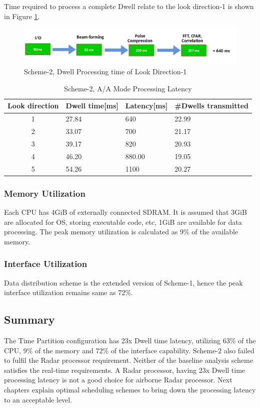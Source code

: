 Time required to process a complete Dwell relate to the look direction-1 is shown in Figure \ref{fig:mm:scheme2_latency_tot}.
\begin{figure}[h!]
	\centering
	\includegraphics[width=145mm]{figures/scheme2_latency_tot}
	\caption{Scheme-2, Dwell Processing time of Look Direction-1}
	\label{fig:mm:scheme2_latency_tot}
\end{figure}

\begin{table}[h!]
	\centering
	\begin{tabular}{|c|l|l|l|} 
	 \hline
	 \textbf{Look direction} & \textbf{Dwell time[ms]} & \textbf{Latency[ms]} & \textbf{\#Dwells transmitted} \\
	 \hline
	 1 & 27.84 & 640 & 22.99 \\ \hline
	 2 & 33.07 & 700 & 21.17 \\ \hline
	 3 & 39.17 & 820 & 20.93 \\ \hline
	 4 & 46.20 & 880.00 & 19.05 \\ \hline
	 5 & 54.26 & 1100 & 20.27 \\ \hline
	\end{tabular}
	\caption{Scheme-2, A/A Mode Processing Latency}
	\label{tbl:existing_analysis:aa_scheme2_latency}
\end{table}

\subsubsection{Memory Utilization}
\label{sss:scheme2:mem_util}
Each CPU has 4GiB of externally connected SDRAM. It is assumed that 3GiB are allocated for OS, storing executable code, etc, 1GiB are available for data processing. The peak memory utilization is calculated as 9\% of the available memory.

\subsubsection{Interface Utilization}
\label{sss:scheme2:interface_util}
Data distribution scheme is the extended version of Scheme-1, hence the peak interface utilization remains same as 72\%.

\subsection{Summary}
\label{sss:scheme2:sar_summary}
The Time Partition configuration has 23x Dwell time latency, utilizing 63\% of the CPU, 9\% of the memory and 72\% of the interface capability. Scheme-2 also failed to fulfil the Radar processor requirement. Neither of the baseline analysis scheme satisfies the real-time requirements. A Radar processor, having 23x Dwell time processing latency is not a good choice for airborne Radar processor. Next chapters explain optimal scheduling schemes to bring down the processing latency to an acceptable level.


